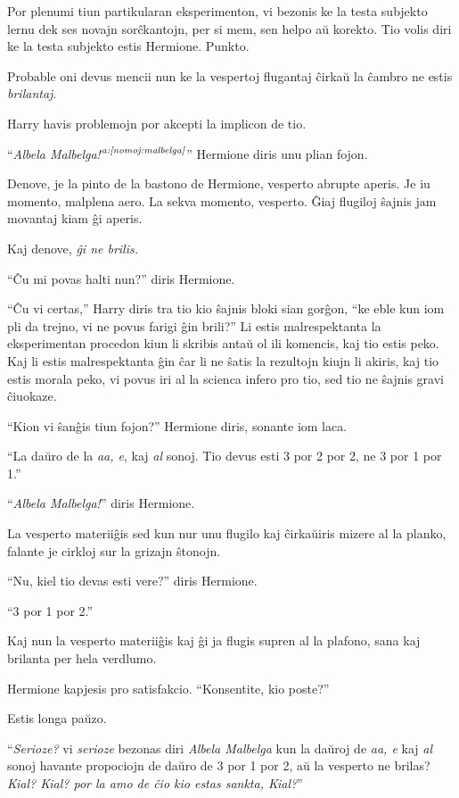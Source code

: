 Por plenumi tiun partikularan eksperimenton, vi bezonis ke la testa
subjekto lernu dek ses novajn sorĉkantojn, per si mem, sen helpo aŭ
korekto. Tio volis diri ke la testa subjekto estis Hermione. Punkto.

Probable oni devus mencii nun ke la vespertoj flugantaj ĉirkaŭ la
ĉambro ne estis \emph{brilantaj}.

Harry havis problemojn por akcepti la implicon de tio.

``\emph{Albela Malbelga!}$^{\textit{a:\ref{nomoj:malbelga}}}$''
Hermione diris unu plian fojon.

Denove, je la pinto de la bastono de Hermione, vesperto abrupte
aperis. Je iu momento, malplena aero. La sekva momento, vesperto. Ĝiaj
flugiloj ŝajnis jam movantaj kiam ĝi aperis.

Kaj denove, \emph{ĝi ne brilis.}

``Ĉu mi povas halti nun?'' diris Hermione.

``Ĉu vi certas,'' Harry diris tra tio kio ŝajnis bloki sian gorĝon,
``ke eble kun iom pli da trejno, vi ne povus farigi ĝin brili?'' Li
estis malrespektanta la eksperimentan procedon kiun li skribis antaŭ
ol ili komencis, kaj tio estis peko. Kaj li estis malrespektanta ĝin ĉar
li ne ŝatis la rezultojn kiujn li akiris, kaj tio estis morala peko,
vi povus iri al la scienca infero pro tio, sed tio ne ŝajnis gravi
ĉiuokaze.

``Kion vi ŝanĝis tiun fojon?'' Hermione diris, sonante iom laca.

``La daŭro de la \emph{aa, e}, kaj \emph{al} sonoj. Tio devus esti 3 por 2 por 2, ne 3 por 1 por 1.''

``\emph{Albela Malbelga!}'' diris Hermione.

La vesperto materiiĝis sed kun nur unu flugilo kaj ĉirkaŭiris mizere
al la planko, falante je cirkloj sur la grizajn ŝtonojn.

``Nu, kiel tio devas esti vere?'' diris Hermione.

``3 por 1 por 2.''

Kaj nun la vesperto materiiĝis kaj ĝi ja flugis supren al la plafono, sana kaj brilanta per hela verdlumo.

Hermione kapjesis pro satisfakcio. ``Konsentite, kio poste?''

Estis longa paŭzo.

``\emph{Serioze?} vi \emph{serioze} bezonas diri \emph{Albela
  Malbelga} kun la daŭroj de \emph{aa, e} kaj \emph{al} sonoj havante
propociojn de daŭro de 3 por 1 por 2, aŭ la vesperto ne brilas?
\emph{Kial? Kial? por la amo de ĉio kio estas sankta, Kial?}''

